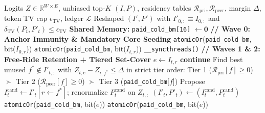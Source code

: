 \documentclass[10pt,twocolumn]{article}
\theoremstyle{definition}
\begin{document}
\begin{algorithm}[t]
\caption{Three-Wave Window Union Set-Cover Router (CTA)}
\label{alg:router}
\footnotesize
\begin{algorithmic}[1]
\Require Logits $Z \in \mathbb{R}^{W \times E}$, unbiased top-$K$ $(I, P)$, residency tables $\mathcal{R}_{\text{pri}}, \mathcal{R}_{\text{peer}}$, margin $\Delta$, token TV cap $\epsilon_{\mathrm{TV}}$, ledger $\mathcal{L}$
\Ensure Reshaped $(I', P')$ with $I'_{0,:} \equiv I_{0,:}$ and $\delta_{\mathrm{TV}}(P_t, P'_t) \le \epsilon_{\mathrm{TV}}$
\State \textbf{Shared Memory:} \texttt{paid\_cold\_bm[16]} $\gets \mathbf{0}$ 
\State \textcolor{chordblue}{\textbf{// Wave 0: Anchor Immunity \& Mandatory Core Seeding}}
   
        \State \texttt{atomicOr}(\texttt{paid\_cold\_bm}, bit($I_{0,r}$))
      \EndIf
    \EndFor
  \Else {}
        \State \texttt{atomicOr}(\texttt{paid\_cold\_bm}, bit($I_{t,r}$))
      \EndIf
    \EndFor
  \EndIf
\EndFor
\State \texttt{\_\_syncthreads()}
\State \textcolor{chordblue}{\textbf{// Waves 1 \& 2: Free-Ride Retention + Tiered Set-Cover}}
  \State $e \gets I_{t,r}$
    \State \textbf{continue} 
  \EndIf
  \State Find best unused $f^* \notin I'_{t,:}$ with $Z_{t,e} - Z_{t,f^*} \le \Delta$ in strict tier order:
  \State \hspace{1.2em} Tier 1 ($\mathcal{R}_{\text{pri}}[f] \ge 0$) $\succ$ Tier 2 ($\mathcal{R}_{\text{peer}}[f] \ge 0$) $\succ$ Tier 3 (\texttt{paid\_cold\_bm}[$f$])
    \State Propose $I^{\text{cand}}_t \gets I'_t[r \leftarrow f^*]$; renormalize $P^{\text{cand}}_t$ on $Z_{t,:}$
      \State $(I'_t, P'_t) \gets (I^{\text{cand}}_t, P^{\text{cand}}_t)$ 
    \Else
      \State \texttt{atomicOr}(\texttt{paid\_cold\_bm}, bit($e$)) 
    \EndIf
  \Else
    \State \texttt{atomicOr}(\texttt{paid\_cold\_bm}, bit($e$))
  \EndIf
\EndFor
\end{algorithmic}
\end{algorithm}
\end{document}
